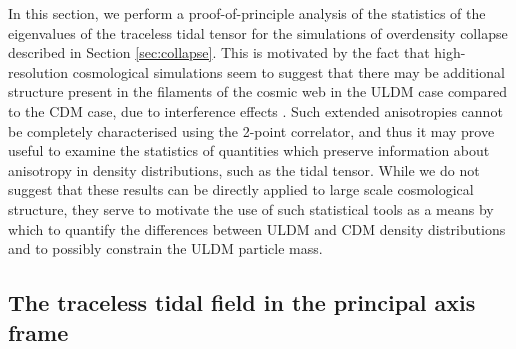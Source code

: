 \documentclass[a4paper,11pt]{article}
\begin{document}
In this section, we perform a proof-of-principle analysis of the statistics of the eigenvalues of the traceless tidal tensor for the simulations of overdensity collapse described in Section \ref{sec:collapse}. This is motivated by the fact that high-resolution cosmological simulations seem to suggest that there may be additional structure present in the filaments of the cosmic web in the ULDM case compared to the CDM case, due to interference effects \cite{Mocz:2019emo}. Such extended anisotropies cannot be completely characterised using the 2-point correlator, and thus it may prove useful to examine the statistics of quantities which preserve information about anisotropy in density distributions, such as the tidal tensor. While we do not suggest that these results can be directly applied to large scale cosmological structure, they serve to motivate the use of such statistical tools as a means by which to quantify the differences between ULDM and CDM density distributions and to possibly constrain the ULDM particle mass. 

\subsection{The traceless tidal field in the principal axis frame}\label{sec:TTT}
\end{document}

